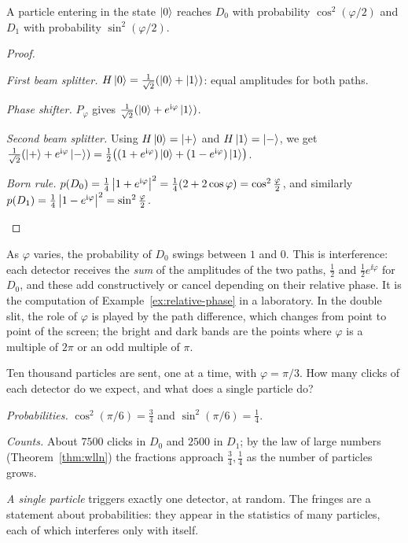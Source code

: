 \begin{proposition}\label{prop:mz}
  A particle entering in the state $\left|0\right\rangle$ reaches $D_0$ with probability $\cos^2(\varphi/2)$ and $D_1$ with probability $\sin^2(\varphi/2)$.
\end{proposition}
\begin{proof}
  \begin{steps}
    \item \emph{First beam splitter.} $H\left|0\right\rangle=\tfrac1{\sqrt2}(\left|0\right\rangle+\left|1\right\rangle)$: equal amplitudes for both paths.
    \item \emph{Phase shifter.} $P_\varphi$ gives $\tfrac1{\sqrt2}(\left|0\right\rangle+e^{\mathrm{i}\varphi}\left|1\right\rangle)$.
    \item \emph{Second beam splitter.} Using $H\left|0\right\rangle=\left|+\right\rangle$ and $H\left|1\right\rangle=\left|-\right\rangle$, we get $\tfrac1{\sqrt2}(\left|+\right\rangle+e^{\mathrm{i}\varphi}\left|-\right\rangle)=\tfrac12\bigl((1+e^{\mathrm{i}\varphi})\left|0\right\rangle+(1-e^{\mathrm{i}\varphi})\left|1\right\rangle\bigr)$.
    \item \emph{Born rule.} $p(D_0)=\tfrac14\left|1+e^{\mathrm{i}\varphi}\right|^2=\tfrac14(2+2\cos\varphi)=\cos^2\tfrac\varphi2$, and similarly $p(D_1)=\tfrac14\left|1-e^{\mathrm{i}\varphi}\right|^2=\sin^2\tfrac\varphi2$. \qedhere
  \end{steps}
\end{proof}

As $\varphi$ varies, the probability of $D_0$ swings between $1$ and $0$. This is interference: each detector receives the \emph{sum} of the amplitudes of the two paths, $\tfrac12$ and $\tfrac12e^{\ii\varphi}$ for $D_0$, and these add constructively or cancel depending on their relative phase. It is the computation of Example~\ref{ex:relative-phase} in a laboratory. In the double slit, the role of $\varphi$ is played by the path difference, which changes from point to point of the screen; the bright and dark bands are the points where $\varphi$ is a multiple of $2\pi$ or an odd multiple of $\pi$.

\begin{example}\label{ex:mz-counts}
  Ten thousand particles are sent, one at a time, with $\varphi=\pi/3$. How many clicks of each detector do we expect, and what does a single particle do?
\end{example}
\begin{solution}
  \begin{steps}
    \item \emph{Probabilities.} $\cos^2(\pi/6)=\tfrac34$ and $\sin^2(\pi/6)=\tfrac14$.
    \item \emph{Counts.} About $7500$ clicks in $D_0$ and $2500$ in $D_1$; by the law of large numbers (Theorem~\ref{thm:wlln}) the fractions approach $\tfrac34,\tfrac14$ as the number of particles grows.
    \item \emph{A single particle} triggers exactly one detector, at random. The fringes are a statement about probabilities: they appear in the statistics of many particles, each of which interferes only with itself.
  \end{steps}
\end{solution}

